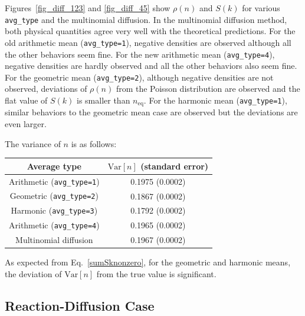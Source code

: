 \documentclass{article}
\begin{document}
Figures~\ref{fig_diff_123} and \ref{fig_diff_45} show $\rho(n)$ and $S(k)$ for various \texttt{avg\_type} and the multinomial diffusion.
In the multinomial diffusion method, both physical quantities agree very well with the theoretical predictions. 
For the old arithmetic mean (\texttt{avg\_type=1}), negative densities are observed although all the other behaviors seem fine.
For the new arithmetic mean (\texttt{avg\_type=4}), negative densities are hardly observed and all the other behaviors also seem fine. 
For the geometric mean (\texttt{avg\_type=2}), although negative densities are not observed, deviations of $\rho(n)$ from the Poisson distribution are observed and the flat value of $S(k)$ is smaller than $n_\mathrm{eq}$. 
For the harmonic mean (\texttt{avg\_type=1}), similar behaviors to the geometric mean case are observed but the deviations are even larger.

The variance of $n$ is as follows:
\begin{center}
{\tabulinesep=1.2mm
\begin{tabu}{|c|c|}
\hline
Average type & $\mathrm{Var}[n]$ (standard error) \\
\hline
Arithmetic (\texttt{avg\_type=1}) & 0.1975 (0.0002) \\
\hline
Geometric (\texttt{avg\_type=2}) & 0.1867 (0.0002) \\
\hline
Harmonic (\texttt{avg\_type=3}) & 0.1792 (0.0002) \\
\hline
Arithmetic (\texttt{avg\_type=4}) & 0.1965 (0.0002) \\
\hline
Multinomial diffusion & 0.1967 (0.0002) \\
\hline
\end{tabu}
}
\end{center}
As expected from Eq.~\eqref{sumSknonzero}, for the geometric and harmonic means, the deviation of $\mathrm{Var}[n]$ from the true value is significant. 

\subsection{Reaction-Diffusion Case}
\end{document}
